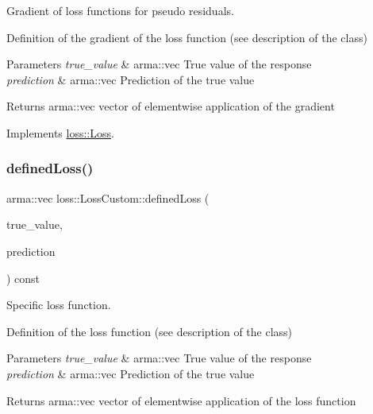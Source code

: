 Gradient of loss functions for pseudo residuals. 

Definition of the gradient of the loss function (see description of the class)


\begin{DoxyParams}{Parameters}
{\em true\+\_\+value} & {\ttfamily arma\+::vec} True value of the response \\
\hline
{\em prediction} & {\ttfamily arma\+::vec} Prediction of the true value\\
\hline
\end{DoxyParams}
\begin{DoxyReturn}{Returns}
{\ttfamily arma\+::vec} vector of elementwise application of the gradient 
\end{DoxyReturn}


Implements \hyperlink{classloss_1_1_loss_a267a4de70747ade4b2d84ce35a448979}{loss\+::\+Loss}.

\mbox{\label{classloss_1_1_loss_custom_ad71351d35d7739651c487c2106571118}} 
\subsubsection{\texorpdfstring{defined\+Loss()}{definedLoss()}}
{\footnotesize\ttfamily arma\+::vec loss\+::\+Loss\+Custom\+::defined\+Loss (\begin{DoxyParamCaption}\item[{const arma\+::vec \&}]{true\+\_\+value,  }\item[{const arma\+::vec \&}]{prediction }\end{DoxyParamCaption}) const\hspace{0.3cm}{\ttfamily [virtual]}}



Specific loss function. 

Definition of the loss function (see description of the class)


\begin{DoxyParams}{Parameters}
{\em true\+\_\+value} & {\ttfamily arma\+::vec} True value of the response \\
\hline
{\em prediction} & {\ttfamily arma\+::vec} Prediction of the true value\\
\hline
\end{DoxyParams}
\begin{DoxyReturn}{Returns}
{\ttfamily arma\+::vec} vector of elementwise application of the loss function 
\end{DoxyReturn}


